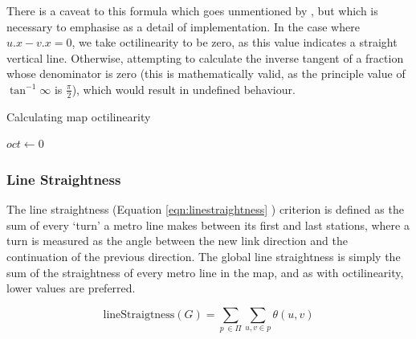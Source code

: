 There is a caveat to this formula which goes unmentioned by \citeauthor{AutomaticMetroMapLayoutThesis}, but which is necessary to emphasise as a detail of implementation. In the case where $u.x - v.x = 0$, we take octilinearity to be zero, as this value indicates a straight vertical line. Otherwise, attempting to calculate the inverse tangent of a fraction whose denominator is zero (this is mathematically valid, as the principle value of $\tan^{-1}\infty$ is $\frac{\pi}{2}$), which would result in undefined behaviour.\\
\begin{algorithm}
\label{alg:octilinearity}
 \caption{Calculating map octilinearity}
 $oct \gets 0$ \;
\end{algorithm}

\subsubsection{Line Straightness}

The line straightness (Equation \ref{eqn:linestraightness} \citep{AutomaticMetroMapLayoutThesis}) criterion is defined as the sum of every `turn' a metro line makes between its first and last stations, where a turn is measured as the angle between the new link direction and the continuation of the previous direction. The global line straightness is simply the sum of the straightness of every metro line in the map, and as with octilinearity, lower values are preferred.

\begin{equation}
	\text{lineStraigtness}(G) = \sum_{p\,\in{\Pi}}\sum_{u, v\in p} \theta(u, v)
\label{eqn:linestraightness}
\end{equation}

